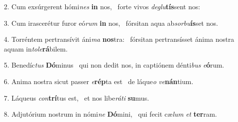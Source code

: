 2. Cum exsúrgerent hómi\textit{nes} \textbf{in} nos, \ast\  forte vivos \textit{de}\textit{glu}\textbf{tís}sent nos:\

3. Cum irascerétur furor eó\textit{rum} \textbf{in} nos, \ast\  fórsitan aqua ab\textit{sor}\textit{bu}\textbf{ís}set nos.\

4. Torréntem pertransívit áni\textit{ma} \textbf{nos}tra: \ast\  fórsitan pertransísset ánima nostra aquam in\textit{to}\textit{le}\textbf{rá}bilem.\

5. Benedíc\textit{tus} \textbf{Dó}minus \ast\  qui non dedit nos, in captiónem dénti\textit{bus} \textit{e}\textbf{ó}rum.\

6. Anima nostra sicut passer \textit{e}\textbf{rép}ta est \ast\  de láque\textit{o} \textit{ve}\textbf{nán}tium.\

7. Láqueus \textit{con}\textbf{trí}tus est, \ast\  et nos libe\textit{rá}\textit{ti} \textbf{su}mus.\

8. Adjutórium nostrum in nómi\textit{ne} \textbf{Dó}mini, \ast\  qui fecit cæ\textit{lum} \textit{et} \textbf{ter}ram.\

